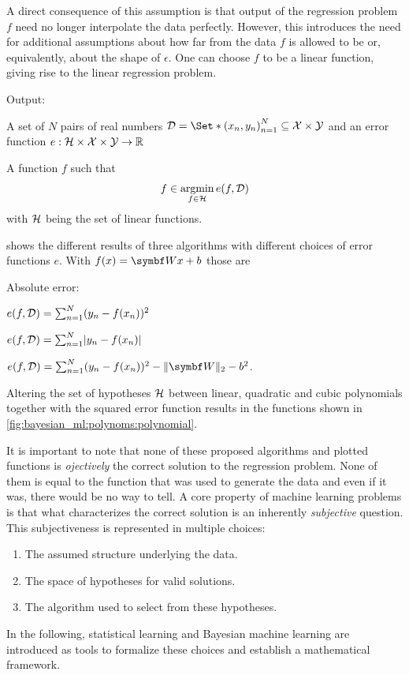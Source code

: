 A direct consequence of this assumption is that output of the regression problem $f$ need no longer interpolate the data perfectly.
However, this introduces the need for additional assumptions about how far from the data $f$ is allowed to be or, equivalently, about the shape of $\epsilon$.
One can choose $f$ to be a linear function, giving rise to the linear regression problem.
\begin{problem}
\begin{labeling}{Output:}
    \item[Input:] A set of $N$ pairs of real numbers $\Dc = \Set*{\left(x_n, y_n\right)}_{n=1}^N \subseteq \Xc \times \Yc$ and an error function $e : \mathcal{H} \times \mathcal{X} \times \mathcal{Y} \to \mathbb{R}$
    \item[Output:] A function $f$ such that
    \begin{align}
        f \in \operatorname*{argmin}_{f \in \mathcal{H}} e(f, \mathcal{D})
    \end{align}
    with $\mathcal{H}$ being the set of linear functions.
\end{labeling}
\end{problem}
 shows the different results of three algorithms with different choices of error functions $e$.
With $f(x) = \mat{W}x + b$ those are
\begin{labeling}{Absolute error:}
    \item[Squared error:] $e(f, \mathcal{D}) = \sum_{n=1}^N (y_n - f(x_n))^2$
    \item[Absolute error:] $e(f, \Dc) = \sum_{n=1}^N \abs{y_n - f(x_n)}$
    \item[Ridge:] $e(f, \Dc) = \sum_{n=1}^N (y_n - f(x_n))^2 - \norm{\mat{W}}_2 - b^2$.
\end{labeling}
Altering the set of hypotheses $\mathcal{H}$ between linear, quadratic and cubic polynomials together with the squared error function results in the functions shown in \cref{fig:bayesian_ml:polynoms:polynomial}.

It is important to note that none of these proposed algorithms and plotted functions is \emph{ojectively} the correct solution to the regression problem.
None of them is equal to the function that was used to generate the data and even if it was, there would be no way to tell.
A core property of machine learning problems is that what characterizes the correct solution is an inherently \emph{subjective} question.
This subjectiveness is represented in multiple choices:
\begin{enumerate}
    \item The assumed structure underlying the data.
    \item The space of hypotheses for valid solutions.
    \item The algorithm used to select from these hypotheses.
\end{enumerate}
In the following, statistical learning and Bayesian machine learning are introduced as tools to formalize these choices and establish a mathematical framework.

